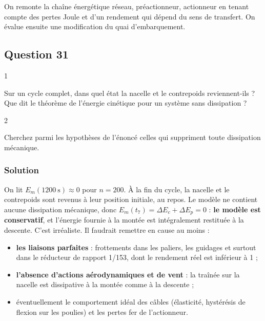 \documentclass[11pt,a4paper]{article}
\providecommand{\tightlist}{\setlength{\itemsep}{0pt}\setlength{\parskip}{0pt}}
\begin{document}
On remonte la chaîne énergétique réseau, préactionneur, actionneur en tenant compte des pertes Joule et d'un rendement qui dépend du sens de transfert. On évalue ensuite une modification du quai d'embarquement.

\hypertarget{question-31}{%
\subsection{Question 31}\label{question-31}}

\begin{indication}{1}

Sur un cycle complet, dans quel état la nacelle et le contrepoids reviennent-ils ? Que dit le théorème de l'énergie cinétique pour un système sans dissipation ?

\end{indication}

\begin{indication}{2}

Cherchez parmi les hypothèses de l'énoncé celles qui suppriment toute dissipation mécanique.

\end{indication}

\hypertarget{solution-30}{%
\subsubsection{Solution}\label{solution-30}}

On lit \(E_m(1200\ \text{s})\approx0\) pour \(n=200\). À la fin du cycle, la nacelle et le contrepoids sont revenus à leur position initiale, au repos. Le modèle ne contient aucune dissipation mécanique, donc \(E_m(t_7)=\Delta E_c+\Delta E_p=0\) : \textbf{le modèle est conservatif}, et l'énergie fournie à la montée est intégralement restituée à la descente. C'est irréaliste. Il faudrait remettre en cause au moins :

\begin{itemize}
\tightlist
\item
  \textbf{les liaisons parfaites} : frottements dans les paliers, les guidages et surtout dans le réducteur de rapport 1/153, dont le rendement réel est inférieur à 1 ;
\item
  \textbf{l'absence d'actions aérodynamiques et de vent} : la traînée sur la nacelle est dissipative à la montée comme à la descente ;
\item
  éventuellement le comportement idéal des câbles (élasticité, hystérésis de flexion sur les poulies) et les pertes fer de l'actionneur.
\end{itemize}
\end{document}
